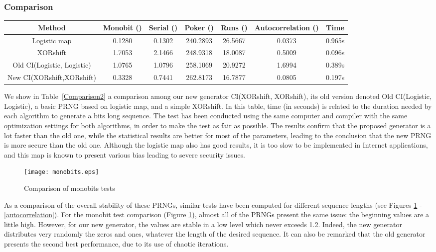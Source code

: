 \documentclass[journal]{IEEEtran}
\begin{document}
\subsubsection{Comparison}
\begin{table*}[!t]
\renewcommand{\arraystretch}{1.3}
\caption{Comparison with Old CI(Logistic, Logistic) for a  bits sequence}
\label{Comparison2}
\centering
\begin{tabular}{ccccccc}
\hline
Method & Monobit ()& Serial ()& Poker ()& Runs ()& Autocorrelation ()& Time \\ \hline
Logistic map &0.1280&0.1302&240.2893&26.5667&0.0373&0.965s \\
XORshift &1.7053&2.1466&248.9318&18.0087&0.5009&0.096s \\
Old CI(Logistic, Logistic) &1.0765&1.0796&258.1069&20.9272&1.6994&0.389s \\
New CI(XORshift,XORshift) &0.3328&0.7441&262.8173&16.7877&0.0805&0.197s\\
\hline
\end{tabular}
\end{table*}
We show in Table~\ref{Comparison2} a comparison among our new generator CI(XORshift, XORshift), its old version denoted Old CI(Logistic, Logistic), a basic PRNG based on logistic map, and a simple XORshift. In this table, time (in seconds) is related to the duration needed by each algorithm to generate a  bits long sequence. The test has been conducted using the same computer and compiler with the same optimization settings for both algorithms, in order to make the test as fair as possible. The results confirm that the proposed generator is a lot faster than the old one, while the statistical results are better for most of the parameters, leading to the conclusion that the new PRNG is more secure than the old one. Although the logistic map also has good results, it is too slow to be implemented in Internet applications, and this map is known to present various bias leading to severe security issues.


\begin{figure}
\centering
\texttt{[image: monobits.eps]}
\caption{Comparison of monobits tests}
\label{monobits}
\end{figure}

As a comparison of the overall stability of these PRNGs, similar tests have been computed for different sequence lengths (see Figures \ref{monobits} - \ref{autocorrelation}).
For the monobit test comparison (Figure \ref{monobits}), almost all of the PRNGs present the same issue: the beginning values are a little high. However, for our new generator, the values are stable in a low level which never exceeds 1.2. Indeed, the new generator distributes very randomly the zeros and ones, whatever the length of the desired sequence. 
It can also be remarked that the old generator presents the second best performance, due to its use of chaotic iterations.
\end{document}
